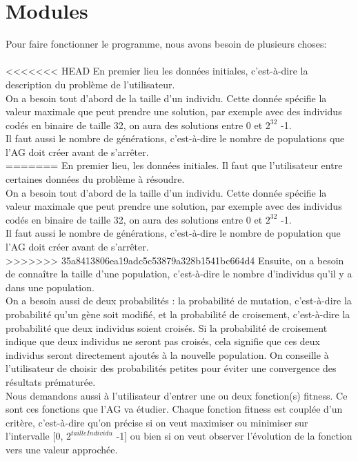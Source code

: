 \documentclass[a4paper,11pt]{article}
\begin{document}
	\section{Modules}
		Pour faire fonctionner le programme, nous avons besoin de plusieurs choses:\\
		\\
<<<<<<< HEAD
		En premier lieu les données initiales, c'est-à-dire la description du problème de l'utilisateur.\\
		On a besoin tout d’abord de la taille d’un individu. 
		Cette donnée spécifie la valeur maximale que peut prendre une solution, par exemple avec des individus codés en binaire de taille 32, on aura des solutions entre 0 et $2^{32}$ -1.\\
		Il faut aussi le nombre de générations, c’est-à-dire le nombre de populations que l’AG doit créer avant de s’arrêter.\\
=======
		En premier lieu, les données initiales. Il faut que l'utilisateur entre certaines données du problème à résoudre.\\
		On a besoin tout d’abord de la taille d’un individu. 
		Cette donnée spécifie la valeur maximale que peut prendre une solution, par exemple avec des individus codés en binaire de taille 32, on aura des solutions entre 0 et $2^{32}$ -1.\\
		Il faut aussi le nombre de générations, c’est-à-dire le nombre de population que l’AG doit créer avant de s’arrêter.\\
>>>>>>> 35a8413806ea19adc5c53879a328b1541bc664d4
		Ensuite, on a besoin de connaître la taille d’une population, c’est-à-dire le nombre d’individus qu’il y a dans une population.\\
		On a besoin aussi de deux probabilités : la probabilité de mutation, c’est-à-dire la probabilité qu’un gène soit modifié, et la probabilité de croisement, c’est-à-dire la probabilité que deux individus soient croisés. 
		Si la probabilité de croisement indique que deux individus ne seront pas croisés, cela signifie que ces deux individus seront directement ajoutés à la nouvelle population. 
		On conseille à l’utilisateur de choisir des probabilités petites pour éviter une convergence des résultats prématurée.\\
		Nous demandons aussi à l’utilisateur d’entrer une ou deux fonction(s) fitness.
		Ce sont ces fonctions que l’AG va étudier.
		Chaque fonction fitness est couplée d’un critère, c’est-à-dire qu’on précise si on veut maximiser ou minimiser sur l’intervalle [0, $2^{tailleIndividu}$ -1] ou bien si on veut observer l’évolution de la fonction vers une valeur approchée.\\
\end{document}

